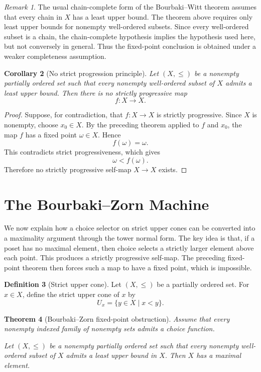 \documentclass[11pt]{article}
\newtheorem{theorem}{Theorem}[section]
\newtheorem{corollary}[theorem]{Corollary}
\theoremstyle{definition}
\newtheorem{definition}[theorem]{Definition}
\theoremstyle{remark}
\newtheorem{remark}[theorem]{Remark}
\begin{document}
\begin{remark}
The usual chain-complete form of the Bourbaki--Witt theorem assumes that every chain in
\(X\) has a least upper bound. The theorem above requires only least upper bounds for
nonempty well-ordered subsets. Since every well-ordered subset is a chain, the
chain-complete hypothesis implies the hypothesis used here, but not conversely in general.
Thus the fixed-point conclusion is obtained under a weaker completeness assumption.
\end{remark}

\begin{corollary}[No strict progression principle]
Let \((X,\leq)\) be a nonempty partially ordered set such that every nonempty
well-ordered subset of \(X\) admits a least upper bound. Then there is no strictly
progressive map
\[
f:X\to X.
\]
\end{corollary}

\begin{proof}
Suppose, for contradiction, that \(f:X\to X\) is strictly progressive. Since \(X\) is
nonempty, choose \(x_0\in X\). By the preceding theorem applied to
\(f\) and \(x_0\), the map \(f\) has a fixed point \(\omega\in X\). Hence
\[
f(\omega)=\omega.
\]
This contradicts strict progressiveness, which gives
\[
\omega<f(\omega).
\]
Therefore no strictly progressive self-map \(X\to X\) exists.
\end{proof}

\section{The Bourbaki--Zorn Machine}

We now explain how a choice selector on strict upper cones can be converted into a
maximality argument through the tower normal form. The key idea is that, if a poset has
no maximal element, then choice selects a strictly larger element above each point. This
produces a strictly progressive self-map. The preceding fixed-point theorem then
forces such a map to have a fixed point, which is impossible.

\begin{definition}[Strict upper cone]
Let \((X,\leq)\) be a partially ordered set. For \(x\in X\), define the strict upper cone of
\(x\) by
\[
U_x=\{y\in X\mid x<y\}.
\]
\end{definition}

\begin{theorem}[Bourbaki--Zorn fixed-point obstruction]
Assume that every nonempty indexed family of nonempty sets admits a choice function.

Let \((X,\leq)\) be a nonempty partially ordered set such that every nonempty
well-ordered subset of \(X\) admits a least upper bound in \(X\). Then \(X\) has a
maximal element.
\end{theorem}
\end{document}
